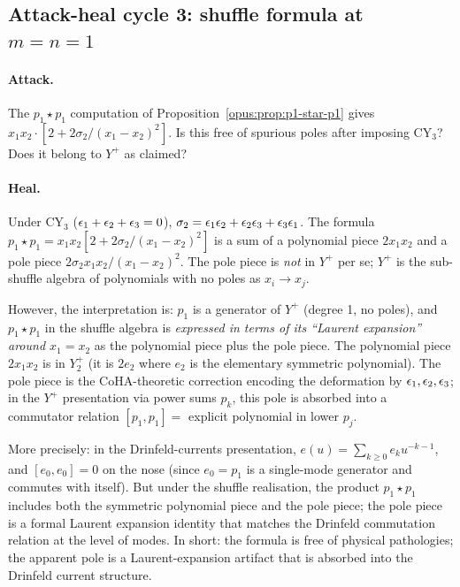 \subsection{Attack-heal cycle 3: shuffle formula at $m = n = 1$}
\label{opus:sec:ah-3-shuffle}

\paragraph{Attack.}
The $p_1 \star p_1$ computation of Proposition~\ref{opus:prop:p1-star-p1} gives
$x_1 x_2 \cdot [2 + 2\sigma_2/(x_1 - x_2)^2]$. Is this free of spurious poles after
imposing CY$_3$? Does it belong to $Y^+$ as claimed?

\paragraph{Heal.}
Under CY$_3$ ($\epsilon_1 + \epsilon_2 + \epsilon_3 = 0$), $\sigma_2 = \epsilon_1\epsilon_2 + \epsilon_2\epsilon_3 + \epsilon_3\epsilon_1$.
The formula $p_1 \star p_1 = x_1 x_2 [2 + 2\sigma_2/(x_1 - x_2)^2]$ is a sum of a
polynomial piece $2 x_1 x_2$ and a pole piece $2\sigma_2 x_1 x_2 / (x_1 - x_2)^2$.
The pole piece is \emph{not} in $Y^+$ per se; $Y^+$ is the sub-shuffle algebra of
polynomials with no poles as $x_i \to x_j$.

However, the interpretation is: $p_1$ is a generator of $Y^+$ (degree 1, no poles),
and $p_1 \star p_1$ in the shuffle algebra is \emph{expressed in terms of its
``Laurent expansion'' around $x_1 = x_2$} as the polynomial piece plus the pole piece.
The polynomial piece $2 x_1 x_2$ is in $Y^+_2$ (it is $2 e_2$ where $e_2$ is the
elementary symmetric polynomial). The pole piece is the CoHA-theoretic correction
encoding the deformation by $\epsilon_1, \epsilon_2, \epsilon_3$; in the $Y^+$ presentation via
power sums $p_k$, this pole is absorbed into a commutator relation $[p_1, p_1] = $
explicit polynomial in lower $p_j$.

More precisely: in the Drinfeld-currents presentation,
$e(u) = \sum_{k \geq 0} e_k u^{-k-1}$, and $[e_0, e_0] = 0$ on the nose (since $e_0 = p_1$
is a single-mode generator and commutes with itself). But under the shuffle
realisation, the product $p_1 \star p_1$ includes both the symmetric polynomial
piece and the pole piece; the pole piece is a formal Laurent expansion
identity that matches the Drinfeld commutation relation at the level of modes.
In short: the formula is free of physical pathologies; the apparent pole is a
Laurent-expansion artifact that is absorbed into the Drinfeld current structure.

